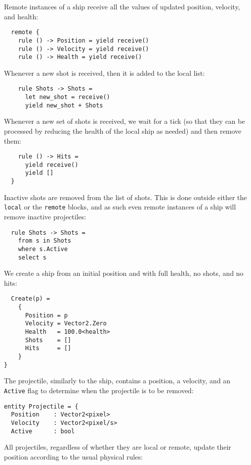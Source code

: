 Remote instances of a ship receive all the values of updated position, velocity, and health:

\begin{lstlisting}
  remote {
    rule () -> Position = yield receive()
    rule () -> Velocity = yield receive()
    rule () -> Health = yield receive()
\end{lstlisting}

Whenever a new shot is received, then it is added to the local list:

\begin{lstlisting}
    rule Shots -> Shots = 
      let new_shot = receive()
      yield new_shot + Shots
\end{lstlisting}

Whenever a new set of shots is received, we wait for a tick (so that they can be processed by reducing the health of the local ship as needed) and then remove them:

\begin{lstlisting}
    rule () -> Hits = 
      yield receive()
      yield []
  }
\end{lstlisting}

Inactive shots are removed from the list of shots. This is done outside either the \texttt{local} or the \texttt{remote} blocks, and as such even remote instances of a ship will remove inactive projectiles:

\begin{lstlisting}
  rule Shots -> Shots = 
    from s in Shots
    where s.Active
    select s
\end{lstlisting}

We create a ship from an initial position and with full health, no shots, and no hits:

\begin{lstlisting}
  Create(p) =
    {
      Position = p
      Velocity = Vector2.Zero
      Health   = 100.0<health>
      Shots    = []
      Hits     = []
    }
}
\end{lstlisting}

The projectile, similarly to the ship, contains a position, a velocity, and an \texttt{Active} flag to determine when the projectile is to be removed:

\begin{lstlisting}
entity Projectile = {
  Position    : Vector2<pixel>
  Velocity    : Vector2<pixel/s>
  Active      : bool
\end{lstlisting}

All projectiles, regardless of whether they are local or remote, update their position according to the usual physical rules:

